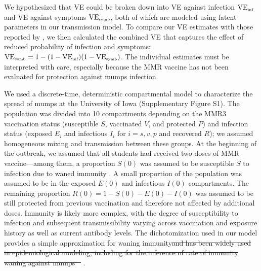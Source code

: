\documentclass[12pt]{article}
\providecommand{\DIFaddtex}[1]{{\protect\color{blue}\uwave{#1}}} %
\providecommand{\DIFdeltex}[1]{{\protect\color{red}\sout{#1}}}                      %
\providecommand{\DIFaddbegin}{} %
\providecommand{\DIFaddend}{} %
\providecommand{\DIFdelbegin}{} %
\providecommand{\DIFdelend}{} %
\providecommand{\DIFadd}[1]{\texorpdfstring{\DIFaddtex{#1}}{#1}} %
\providecommand{\DIFdel}[1]{\texorpdfstring{\DIFdeltex{#1}}{}} %
\newcommand{\DIFscaledelfig}{0.5}
\newlength{\DIFdelgraphicswidth} %
\newlength{\DIFdelgraphicsheight} %
\newcommand{\DIFaddincludegraphics}[2][]{{\color{blue}\fbox{\DIFOincludegraphics[#1]{#2}}}} %
\newcommand{\DIFdelincludegraphics}[2][]{%
\sbox{\DIFdelgraphicsbox}{\DIFOincludegraphics[#1]{#2}}%
\settoboxwidth{\DIFdelgraphicswidth}{\DIFdelgraphicsbox} %
\settoboxtotalheight{\DIFdelgraphicsheight}{\DIFdelgraphicsbox} %
\scalebox{\DIFscaledelfig}{%
\parbox[b]{\DIFdelgraphicswidth}{\usebox{\DIFdelgraphicsbox}\\[-\baselineskip] \rule{\DIFdelgraphicswidth}{0em}}\llap{\resizebox{\DIFdelgraphicswidth}{\DIFdelgraphicsheight}{%
\setlength{\unitlength}{\DIFdelgraphicswidth}%
\begin{picture}(1,1)%
\thicklines\linethickness{2pt} %
{\color[rgb]{1,0,0}\put(0,0){\framebox(1,1){}}}%
{\color[rgb]{1,0,0}\put(0,0){\line( 1,1){1}}}%
{\color[rgb]{1,0,0}\put(0,1){\line(1,-1){1}}}%
\end{picture}%
}\hspace*{3pt}}} %
} %
\DeclareRobustCommand{\DIFaddbegin}{\DIFOaddbegin \let\includegraphics\DIFaddincludegraphics} %
\DeclareRobustCommand{\DIFaddend}{\DIFOaddend \let\includegraphics\DIFOincludegraphics} %
\DeclareRobustCommand{\DIFdelbegin}{\DIFOdelbegin \let\includegraphics\DIFdelincludegraphics} %
\DeclareRobustCommand{\DIFdelend}{\DIFOaddend \let\includegraphics\DIFOincludegraphics} %
\begin{document}
\DIFaddend We hypothesized that VE could be broken down into VE against infection $\mathrm{VE}_{\textrm{\tiny{inf}}}$ and VE against symptoms $\mathrm{VE}_{\textrm{\tiny{symp}}}$, both of which are modeled using latent parameters in our transmission model.
To compare our VE estimates with those reported by \cite{cardemil2017effectiveness}, we then calculated the combined VE that captures the effect of reduced probability of infection and symptoms: $\mathrm{VE}_{\textrm{\tiny{comb}}} = 1 - (1 - \mathrm{VE}_{\textrm{\tiny{inf}}})(1- \mathrm{VE}_{\textrm{\tiny{symp}}})$.
The individual estimates must be interpreted with care, especially because the MMR vaccine has not been evaluated for protection against mumps infection. 

We used a discrete-time, deterministic compartmental model to characterize the spread of mumps at the University of Iowa (Supplementary Figure S1).
The population was divided into 10 compartments depending on the MMR3 vaccination status (susceptible $S$, vaccinated $V$, and protected $P$) and infection status (exposed $E_i$ and infectious $I_i$ for $i = s, v, p$ and recovered $R$); we assumed homogeneous mixing and transmission between these groups.
At the beginning of the outbreak, we assumed that all students had received two doses of MMR vaccine---among them, a proportion $S(0)$ was assumed to be susceptible $S$ to infection due to waned immunity \DIFaddbegin \DIFadd{(i.e., in the SEIRS sense)}\DIFaddend .
A small proportion of the population was assumed to be in the exposed $E(0)$ and infectious $I(0)$ compartments.
The remaining proportion $R(0) = 1-S(0) - E(0) - I(0)$ was assumed to be still protected from previous vaccination and therefore not affected by additional doses.
Immunity is likely more complex, with the degree of susceptibility to infection and subsequent transmissibility varying across vaccination and exposure history as well as current antibody levels.
The dichotomization used in our model provides a simple approximation for waning immunity\DIFdelbegin \DIFdel{and has been widely used in epidemiological modeling, including for the inference of rate of immunity waning against mumps \mbox{%
\citep{lewnard2018vaccine}}\hskip0pt%
}\DIFdelend .
\end{document}
